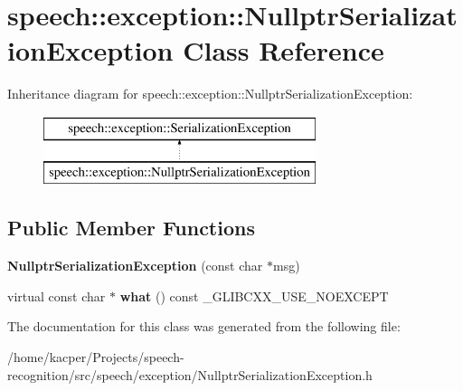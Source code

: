 \hypertarget{classspeech_1_1exception_1_1NullptrSerializationException}{\section{speech\+:\+:exception\+:\+:Nullptr\+Serialization\+Exception Class Reference}
\label{classspeech_1_1exception_1_1NullptrSerializationException}
}
Inheritance diagram for speech\+:\+:exception\+:\+:Nullptr\+Serialization\+Exception\+:\begin{figure}[H]
\begin{center}
\leavevmode
\includegraphics[height=2.000000cm]{classspeech_1_1exception_1_1NullptrSerializationException}
\end{center}
\end{figure}
\subsection*{Public Member Functions}
\begin{DoxyCompactItemize}
\item 
\hypertarget{classspeech_1_1exception_1_1NullptrSerializationException_a959396c385ef4483137e683d26c92649}{{\bfseries Nullptr\+Serialization\+Exception} (const char $\ast$msg)}\label{classspeech_1_1exception_1_1NullptrSerializationException_a959396c385ef4483137e683d26c92649}

\item 
\hypertarget{classspeech_1_1exception_1_1NullptrSerializationException_abd249bbe77755b13a85cf9b415c48a40}{virtual const char $\ast$ {\bfseries what} () const \+\_\+\+G\+L\+I\+B\+C\+X\+X\+\_\+\+U\+S\+E\+\_\+\+N\+O\+E\+X\+C\+E\+P\+T}\label{classspeech_1_1exception_1_1NullptrSerializationException_abd249bbe77755b13a85cf9b415c48a40}

\end{DoxyCompactItemize}


The documentation for this class was generated from the following file\+:\begin{DoxyCompactItemize}
\item 
/home/kacper/\+Projects/speech-\/recognition/src/speech/exception/Nullptr\+Serialization\+Exception.\+h\end{DoxyCompactItemize}
